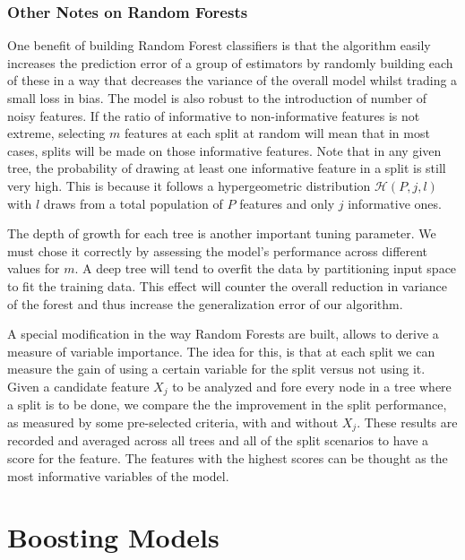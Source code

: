\subsubsection{Other Notes on Random Forests}
One benefit of building Random Forest classifiers is that the algorithm easily increases the prediction error of a group of estimators by randomly building each of these in a way that decreases the variance of the overall model whilst trading a small loss in bias. The model is also robust to the introduction of number of noisy features. If the ratio of informative to non-informative features is not extreme, selecting $m$ features at each split at random will mean that in most cases, splits will be made on those informative features. Note that in any given tree, the probability of drawing at least one informative feature in a split is still very high. This is because it follows a hypergeometric distribution $\mathcal{H}(P,j,l)$ with $l$ draws from a total population of $P$ features and only $j$ informative ones.

The depth of growth for each tree is another important tuning parameter. We must chose it correctly by assessing the model's performance across different values for $m$.  A deep tree will tend to overfit the data by partitioning input space to fit the training data. This effect will counter the overall reduction in variance of the forest and thus increase the generalization error of our algorithm.


A special modification in the way Random Forests are built, allows to derive a measure of variable importance. The idea for this, is that at each split we can measure the gain of using a certain variable for the split versus not using it. Given a candidate feature $X_j$ to be analyzed and fore every node in a tree where a split is to be done, we compare the the improvement in the split performance, as measured by some pre-selected criteria, with and without $X_j$. These results are recorded and averaged across all trees and all of the split scenarios to have a score for the feature. The features with the highest scores can be thought as the most informative variables of the model.



\section{Boosting Models}\label{section-boosting}
